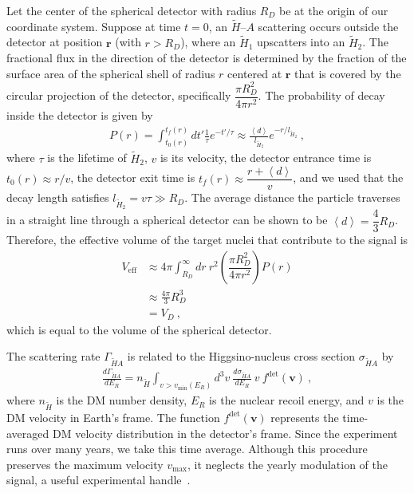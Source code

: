 \documentclass[aps,prd,amsmath,amssymb,10pt,letterpaper,balancelastpage,showpacs,superscriptaddress,nofootinbib,floatfix,notitlepage,longbibliography,twocolumn
]{revtex4-2}
\newcommand{\rbold}{\mathbf{r}}
\newcommand{\vbold}{\mathbf{v}}
\newcommand{\sxA}{\sigma_{\Ht A}}
\newcommand{\GxA}{\Gamma_{\Ht A}}
\newcommand{\Veff}{V_{\text{eff}}}
\newcommand{\nx}{n_{\Ht}}
\newcommand{\vmin}{v_{\text{min}}}
\newcommand{\vmax}{v_{\text{max}}}
\newcommand{\Ht}{\tilde{H}}
\newcommand{\Hone}{\tilde{H}_1}
\newcommand{\Htwo}{\tilde{H}_2}
\newcommand{\lH}{l_{\tilde{H}_2}}
\begin{document}
Let the center of the spherical detector with radius $R_D$ be at the origin of our coordinate system. Suppose at time $t=0$, an $\Ht$--$A$ scattering occurs outside the detector at position $\rbold$ (with $r>R_D$), where an $\Hone$ upscatters into an $\Htwo$. 
The fractional flux in the direction of the detector is determined by the fraction of the surface area of the spherical shell of radius $r$ centered at $\rbold$ that is covered by the circular projection of the detector, specifically $\dfrac{\pi R_D^2}{4\pi r^2}$. The probability of decay inside the detector is given by
\begin{align}
    P(r) = \int_{t_0(r)}^{t_f(r)} dt' \frac{1}{\tau} e^{-t'/\tau} \approx \frac{\left< d \right>}{\lH} e^{-r/\lH} ~,
\end{align}
where $\tau$ is the lifetime of $\Htwo$, $v$ is its velocity, the detector entrance time is $t_0(r) \approx r/v$, the detector exit time is $t_f(r) \approx \dfrac{r+\left< d \right>}{v}$, and we used that the decay length satisfies $\lH = v\tau \gg R_D$. The average distance the particle traverses in a straight line through a spherical detector can be shown to be $\left< d \right> = \dfrac{4}{3} R_D$. Therefore, the effective volume of the target nuclei that contribute to the signal is 
\begin{align} \label{eq:Veff estimate}
\Veff &\approx 4\pi \int_{R_D}^{\infty} dr ~ r^2 \left(\dfrac{\pi R_D^2}{4\pi r^2}\right) P(r) \\
&\approx \frac{4\pi}{3} R_D^3 \\
&= V_D ~,
\end{align}
which is equal to the volume of the spherical detector.

The scattering rate $\GxA$ is related to the Higgsino-nucleus cross section $\sxA$ by
\begin{align}
    \frac{d \GxA}{dE_R}= \nx \int_{v>\vmin(E_R)} d^3v~ \frac{d \sxA}{dE_R}~ v ~f^{\text{det}}(\vbold) ~,
\end{align}
where $\nx$ is the DM number density, $E_R$ is the nuclear recoil energy,  and $v$ is the DM velocity in Earth's frame. The function $f^{\text{det}}(\vbold)$ represents the time-averaged DM velocity distribution in the detector's frame. Since the experiment runs over many years, we take this time average. Although this procedure preserves the maximum velocity $\vmax$, it neglects the yearly modulation of the signal, a useful experimental handle~\cite{Luminous}.
\end{document}
